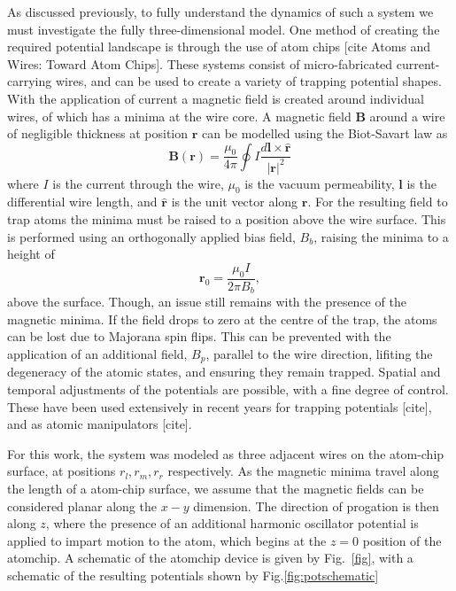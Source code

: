 As discussed previously, to fully understand the dynamics of such a system we must investigate the fully three-dimensional model. One method of creating the required potential landscape is through the use of atom chips \cite{Bartenstein_ieee_2000}[cite Atoms and Wires: Toward Atom Chips]. These systems consist of micro-fabricated current-carrying wires, and can be used to create a variety of trapping potential shapes. With the application of current a magnetic field is created around individual wires, of which has a minima at the wire core. A magnetic field $\mathbf{B}$ around a wire of negligible thickness at position $\mathbf{r}$ can be modelled using the Biot-Savart law as
\begin{equation}
    \mathbf{B}(\mathbf{r}) = \frac{\mu_0}{4\pi}\oint I \frac{d\mathbf{l}\times \hat{\mathbf{r}}}{|\mathbf{r}|^2}
\end{equation}
where $I$ is the current through the wire, $\mu_0$ is the vacuum permeability, $\mathbf{l}$ is the differential wire length, and $\hat{\mathbf{r}}$ is the unit vector along $\mathbf{r}$. For the resulting field to trap atoms the minima must be raised to a position above the wire surface. This is performed using an orthogonally applied bias field, ${B}_b$, raising the minima to a height of
\begin{equation}
    \mathbf{r}_0 = \frac{\mu_0 I}{2\pi {B}_b},
\end{equation}
above the surface. Though, an issue still remains with the presence of the magnetic minima. If the field drops to zero at the centre of the trap, the atoms can be lost due to Majorana spin flips. This can be prevented with the application of an additional field, ${B}_{p}$, parallel to the wire direction, lifiting the degeneracy of the atomic states, and ensuring they remain trapped. Spatial and temporal adjustments of the potentials are possible, with a fine degree of control. These have been used extensively in recent years for trapping potentials [cite], and as atomic manipulators [cite].

For this work, the system was modeled as three adjacent wires on the atom-chip surface, at positions $r_l, r_m, r_r$ respectively. As the magnetic minima travel along the length of a atom-chip surface, we assume that the magnetic fields can be considered planar along the $x-y$ dimension. The direction of progation is then along $z$, where the presence of an additional harmonic oscillator potential is applied to impart motion to the atom, which begins at the $z=0$ position of the atomchip. A schematic of the atomchip device is given by Fig.~\ref{fig}, with a schematic of the resulting potentials shown by Fig.\ref{fig:potschematic}


